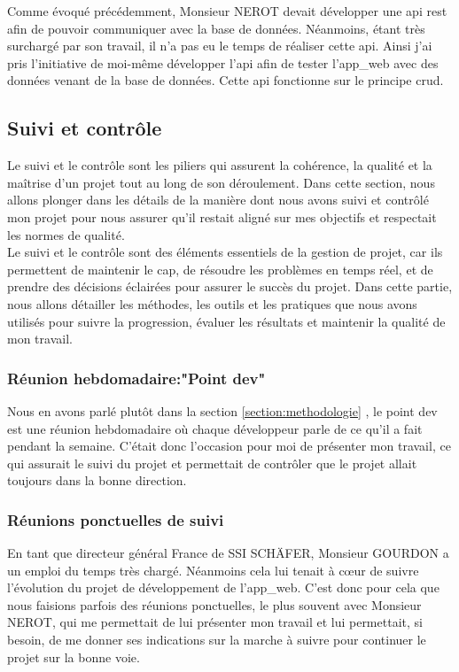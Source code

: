 \documentclass[a4paper, 12pt, french]{article}
\begin{document}
					Comme évoqué précédemment, Monsieur NEROT devait développer une \acrshort{api} \acrshort{rest} afin de pouvoir communiquer avec la base de données. Néanmoins, étant très surchargé par son travail, il n'a pas eu le temps de réaliser cette \acrshort{api}. Ainsi j'ai pris l'initiative de moi-même développer l'\acrshort{api} afin de tester l'\gls{app_web} avec des données venant de la base de données. Cette \acrshort{api} fonctionne sur le principe \gls{crud}.
			
			\subsection{Suivi et contrôle}
				Le suivi et le contrôle sont les piliers qui assurent la cohérence, la qualité et la maîtrise d'un projet tout au long de son déroulement. Dans cette section, nous allons plonger dans les détails de la manière dont nous avons suivi et contrôlé mon projet pour nous assurer qu'il restait aligné sur mes objectifs et respectait les normes de qualité.\\

				Le suivi et le contrôle sont des éléments essentiels de la gestion de projet, car ils permettent de maintenir le cap, de résoudre les problèmes en temps réel, et de prendre des décisions éclairées pour assurer le succès du projet. Dans cette partie, nous allons détailler les méthodes, les outils et les pratiques que nous avons utilisés pour suivre la progression, évaluer les résultats et maintenir la qualité de mon travail.
				\newpage
				\subsubsection{Réunion hebdomadaire:"Point dev"}
					Nous en avons parlé plutôt dans la section \ref{section:methodologie} , le point dev est une réunion hebdomadaire où chaque développeur parle de ce qu'il a fait pendant la semaine. C'était donc l'occasion pour moi de présenter mon travail, ce qui assurait le suivi du projet et permettait de contrôler que le projet allait toujours dans la bonne direction.
					
				\subsubsection{Réunions ponctuelles de suivi}
					En tant que directeur général France de SSI SCHÄFER, Monsieur GOURDON a un emploi du temps très chargé. Néanmoins cela lui tenait à c\oe ur de suivre l'évolution du projet de développement de l'\gls{app_web}. C'est donc pour cela que nous faisions parfois des réunions ponctuelles, le plus souvent avec Monsieur NEROT, qui me permettait de lui présenter mon travail et lui permettait, si besoin, de me donner ses indications sur la marche à suivre pour continuer le projet sur la bonne voie.
\end{document}

